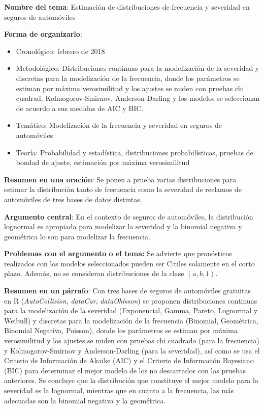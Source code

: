 \documentclass[
  letterpaper,
  onepage,
  openany]{scrreprt}
\begin{document}
\begin{enumerate}
  \textbf{Nombre del tema}: Estimación de distribuciones de frecuencia y
  severidad en seguros de automóviles

  \textbf{Forma de organizarlo}:

  \begin{itemize}
  \item
    Cronológico: febrero de 2018
  \item
    Metodológico: Distribuciones continuas para la modelización de la
    severidad y discretas para la modelización de la frecuencia, donde
    los parámetros se estiman por máxima verosimilitud y los ajustes se
    miden con pruebas chi cuadrad, Kolmogorov-Smirnov, Anderson-Darling
    y los modelos se seleccionan de acuerdo a sus medidas de AIC y BIC.
  \item
    Temático: Modelización de la frecuencia y severidad en seguros de
    automóviles
  \item
    Teoría: Probabilidad y estadística, distribuciones probabilísticas,
    pruebas de bondad de ajuste, estimación por máxima verosimilitud
  \end{itemize}

  \textbf{Resumen en una oración}: Se ponen a prueba varias
  distribuciones para estimar la distribución tanto de frecuencia como
  la severidad de reclamos de automóviles de tres bases de datos
  distintas.

  \textbf{Argumento central}: En el contexto de seguros de automóviles,
  la distribución lognormal es apropiada para modelizar la severidad y
  la binomial negativa y geométrica lo son para modelizar la frecuencia.

  \textbf{Problemas con el argumento o el tema:} Se advierte que
  pronósticos realizados con los modelos seleccionados pueden ser
  C:tiles solamente en el corto plazo. Además, no se consideran
  distribuciones de la clase \((a,b,1)\).

  \textbf{Resumen en un párrafo}: Con tres bases de seguros de
  automóviles gratuitas en R (\emph{AutoCollision}, \emph{dataCar},
  \emph{dataOhlsson}) se proponen distribuciones continuas para la
  modelización de la severidad (Exponencial, Gamma, Pareto, Lognormal y
  Weibull) y discretas para la modelización de la frecuencia (Binomial,
  Geométrica, Binomial Negativa, Poisson), donde los parámetros se
  estiman por máxima verosimilitud y los ajustes se miden con pruebas
  chi cuadrado (para la frecuencia) y Kolmogorov-Smirnov y
  Anderson-Darling (para la severidad), así como se usa el Criterio de
  Información de Akaike (AIC) y el Criterio de Información Bayesiano
  (BIC) para determinar el mejor modelo de los no descartados con las
  pruebas anteriores. Se concluye que la distribución que constituye el
  mejor modelo para la severidad es la lognormal, mientras que en cuanto
  a la frecuencia, las más adecuadas son la binomial negativa y la
  geométrica.
\end{enumerate}
\end{document}
